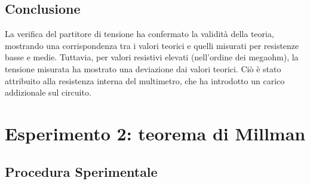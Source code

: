 \subsection{Conclusione}
La verifica del partitore di tensione ha confermato la validità della teoria, mostrando una corrispondenza tra i valori teorici e quelli misurati per resistenze basse e medie. Tuttavia, per valori resistivi elevati (nell’ordine dei megaohm), la tensione misurata ha mostrato una deviazione dai valori teorici. Ciò è stato attribuito alla resistenza interna del multimetro, che ha introdotto un carico addizionale sul circuito. 

\section{Esperimento 2: teorema di Millman}
\subsection{Procedura Sperimentale}

